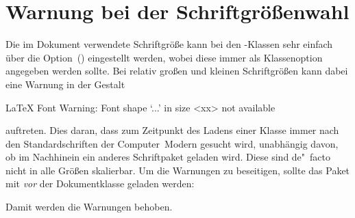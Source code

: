 \section{Warnung bei der Schriftgrößenwahl}
%
%
Die im Dokument verwendete Schriftgröße kann bei den \KOMAScript-Klassen sehr 
einfach über die Option~() eingestellt 
werden, wobei diese immer als Klassenoption angegeben werden sollte. Bei 
relativ großen und kleinen Schriftgrößen kann dabei eine Warnung in der Gestalt 
%
\begin{quoting}[rightmargin=0pt]
\begin{Code}[escapechar=§]
LaTeX Font Warning: Font shape `...' in size <xx> not available
\end{Code}
\end{quoting}
%
auftreten. Dies daran, dass zum Zeitpunkt des Ladens einer Klasse immer nach 
den Standardschriften der Computer~Modern gesucht wird, unabhängig davon, ob im 
Nachhinein ein anderes Schriftpaket geladen wird. Diese sind de"~facto nicht 
in alle Größen skalierbar. Um die Warnungen zu beseitigen, sollte das Paket 
 mit  \emph{vor} der Dokumentklasse 
geladen werden:
%
\begin{quoting}[rightmargin=0pt]
\end{quoting}
%
Damit werden die Warnungen behoben.




